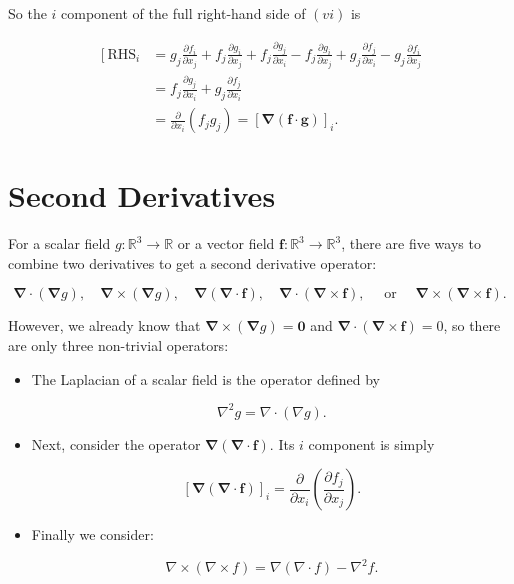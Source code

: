 \begin{remark}
So the \(i\) component of the full right-hand side of \((v i)\) is

\[
\begin{aligned}
{\left[\mathrm{RHS}_i\right.} & =g_j \frac{\partial f_i}{\partial x_j}+f_j \frac{\partial g_i}{\partial x_j}+f_j \frac{\partial g_j}{\partial x_i}-f_j \frac{\partial g_i}{\partial x_j}+g_j \frac{\partial f_j}{\partial x_i}-g_j \frac{\partial f_i}{\partial x_j} \\
& =f_j \frac{\partial g_j}{\partial x_i}+g_j \frac{\partial f_j}{\partial x_i} \\
& =\frac{\partial}{\partial x_i}\left(f_j g_j\right)=[\boldsymbol{\nabla}(\boldsymbol{f} \cdot \boldsymbol{g})]_i .
\end{aligned}
\]

\end{remark}


\section{Second Derivatives}

\begin{definition}
  For a scalar field \(g: \mathbb{R}^3 \rightarrow \mathbb{R}\) or a vector field \(\boldsymbol{f}: \mathbb{R}^3 \rightarrow \mathbb{R}^3\), there are five ways to combine two derivatives to get a second derivative operator:

\[
\boldsymbol{\nabla} \cdot(\boldsymbol{\nabla} g), \quad \boldsymbol{\nabla} \times(\boldsymbol{\nabla} g), \quad \boldsymbol{\nabla}(\boldsymbol{\nabla} \cdot \boldsymbol{f}), \quad \boldsymbol{\nabla} \cdot(\boldsymbol{\nabla} \times \boldsymbol{f}), \quad \text { or } \quad \boldsymbol{\nabla} \times(\boldsymbol{\nabla} \times \boldsymbol{f}) .
\]

However, we already know that \(\boldsymbol{\nabla} \times(\boldsymbol{\nabla} g)=\mathbf{0}\) and \(\boldsymbol{\nabla} \cdot(\boldsymbol{\nabla} \times \boldsymbol{f})=0\), so there are only three non-trivial operators:

\begin{itemize}
  \item The Laplacian of a scalar field is the operator defined by

\[
\nabla^2 g=\nabla \cdot(\nabla g) .
\]
\item Next, consider the operator \(\boldsymbol{\nabla}(\boldsymbol{\nabla} \cdot \boldsymbol{f})\). Its \(i\) component is simply

\[
[\boldsymbol{\nabla}(\boldsymbol{\nabla} \cdot \boldsymbol{f})]_i=\frac{\partial}{\partial x_i}\left(\frac{\partial f_j}{\partial x_j}\right) .
\]
\item Finally we consider:

  \[\nabla \times(\nabla \times f)=\nabla(\nabla \cdot f)-\nabla^2 f .\]

\end{itemize}

\end{definition}

